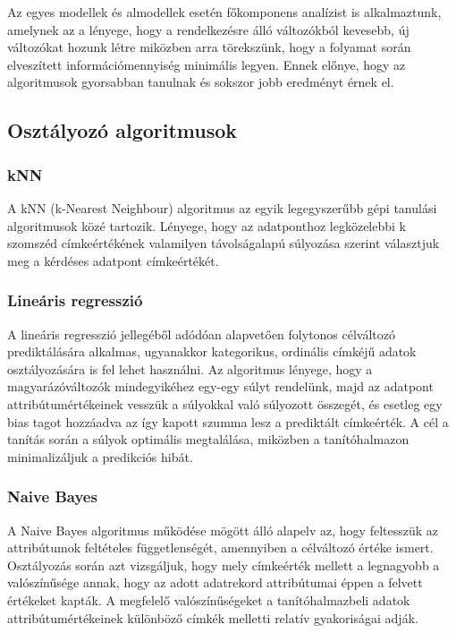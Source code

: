\documentclass[12pt]{article}
\begin{document}
Az egyes modellek és almodellek esetén főkomponens analízist is alkalmaztunk, amelynek az a lényege, hogy a rendelkezésre álló változókból kevesebb, új változókat hozunk létre miközben arra törekszünk, hogy a folyamat során elveszített információmennyiség minimális legyen. Ennek előnye, hogy az algoritmusok gyorsabban tanulnak és sokszor jobb eredményt érnek el.


\subsection{Osztályozó algoritmusok}

\subsubsection{kNN}

A kNN (k-Nearest Neighbour) algoritmus az egyik legegyszerűbb gépi tanulási algoritmusok közé tartozik. Lényege, hogy az adatponthoz legközelebbi k szomszéd címkeértékének valamilyen távolságalapú súlyozása szerint választjuk meg a kérdéses adatpont címkeértékét.

\subsubsection{Lineáris regresszió}

A lineáris regresszió jellegéből adódóan alapvetően folytonos célváltozó prediktálására alkalmas, ugyanakkor kategorikus, ordinális címkéjű adatok osztályozására is fel lehet használni. Az algoritmus lényege, hogy a magyarázóváltozók mindegyikéhez egy-egy súlyt rendelünk, majd az adatpont attribútumértékeinek vesszük a súlyokkal való súlyozott összegét, és esetleg egy bias tagot hozzáadva az így kapott szumma lesz a prediktált címkeérték. A cél a tanítás során a súlyok optimális megtalálása, miközben a tanítóhalmazon minimalizáljuk a predikciós hibát.

\subsubsection{Naive Bayes}

A Naive Bayes algoritmus működése mögött álló alapelv az, hogy feltesszük az attribútumok feltételes függetlenségét, amennyiben a célváltozó értéke ismert. Osztályozás során azt vizsgáljuk, hogy mely címkeérték mellett a legnagyobb a valószínűsége annak, hogy az adott adatrekord attribútumai éppen a felvett értékeket kapták. A megfelelő valószínűségeket a tanítóhalmazbeli adatok attribútumértékeinek különböző címkék melletti relatív gyakoriságai adják.
\end{document}
